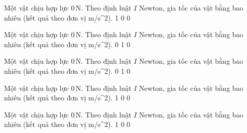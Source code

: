 \begin{ex}
Một vật chịu hợp lực $0\,\text{N}$. Theo định luật $I$ Newton, gia tốc của vật bằng bao nhiêu (kết quả theo đơn vị m/s^2).
\choice
{1}
{}
{0}
{0}
\end{ex}

\begin{ex}
Một vật chịu hợp lực $0\,\text{N}$. Theo định luật $I$ Newton, gia tốc của vật bằng bao nhiêu (kết quả theo đơn vị m/s^2).
\choice
{0}
{1}
{}
{0}
\end{ex}

\begin{ex}
Một vật chịu hợp lực $0\,\text{N}$. Theo định luật $I$ Newton, gia tốc của vật bằng bao nhiêu (kết quả theo đơn vị m/s^2).
\choice
{0}
{1}
{0}
{}
\end{ex}

\begin{ex}
Một vật chịu hợp lực $0\,\text{N}$. Theo định luật $I$ Newton, gia tốc của vật bằng bao nhiêu (kết quả theo đơn vị m/s^2).
\choice
{}
{1}
{0}
{0}
\end{ex}

\begin{ex}
Một vật chịu hợp lực $0\,\text{N}$. Theo định luật $I$ Newton, gia tốc của vật bằng bao nhiêu (kết quả theo đơn vị m/s^2).
\choice
{1}
{}
{0}
{0}
\end{ex}


